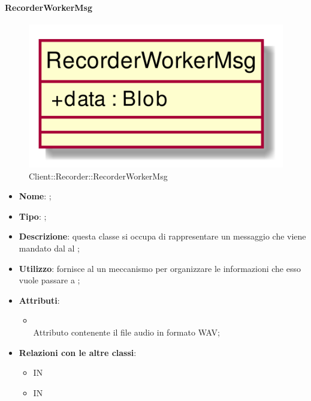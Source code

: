 \hypertarget{RecorderWorkerMsg_label}{\paragraph{RecorderWorkerMsg}}
\begin{figure}[h]
	\centering
	\includegraphics[width=\textwidth,height=\textheight,keepaspectratio]{images/ClassRecorderWorkerMsg.png}
	\caption{Client::Recorder::RecorderWorkerMsg}
\end{figure}
\begin{itemize}
	\item \textbf{Nome}: ;
	\item \textbf{Tipo}: ;
	\item \textbf{Descrizione}: questa classe si occupa di rappresentare un messaggio che viene mandato dal  al ;
	\item \textbf{Utilizzo}: fornisce al  un meccanismo per organizzare le informazioni che esso vuole passare a ;
	\item \textbf{Attributi}:
	\begin{itemize}
		\item[]  \\
		Attributo contenente il file audio in formato WAV;
	\end{itemize}
	\item \textbf{Relazioni con le altre classi}:
	\begin{itemize}
		\item IN \hyperlink{RecorderWorker_label}{}
		\item IN \hyperlink{Recorder_label}{}
	\end{itemize}
\end{itemize}
\FloatBarrier

